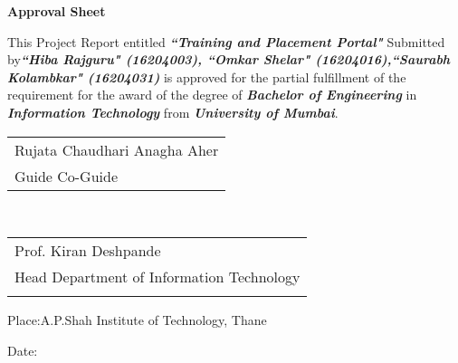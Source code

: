 \newpage
\thispagestyle{empty}
\vspace*{0.2cm}
\vspace{1cm}
\begin{center}
 \large\textbf{Approval Sheet}
\end{center}
\vspace{1cm}

\begin{flushleft} This Project Report entitled \textbf{\textit{``Training and Placement Portal"}} Submitted by\textbf{\textit{``Hiba Rajguru" (16204003), ``Omkar Shelar" (16204016),``Saurabh Kolambkar" (16204031)}} is approved for the partial fulfillment of the requirement for the award of the degree of \textbf{\textit{Bachelor of Engineering} }in\textbf{ \textit{Information Technology}} from \textbf{\textit{University of Mumbai}}.
\end{flushleft}


\vspace{40mm}
\begin{tabular}{@{}l@{}}
Rujata Chaudhari\hspace{78mm}    Anagha Aher\\
\hspace{10mm}Guide \hspace{91mm}      Co-Guide\\

\end{tabular}
\vspace{40mm}\\
\hfill
\begin{tabular}{@{}l@{}}
\hspace{55mm} Prof. Kiran Deshpande\\
\hspace{40mm}Head Department of Information Technology \\

\vspace{5mm}
\end{tabular}

\vspace{40mm}
Place:A.P.Shah Institute of Technology, Thane\par
\vspace{1mm}
Date:
\clearpage